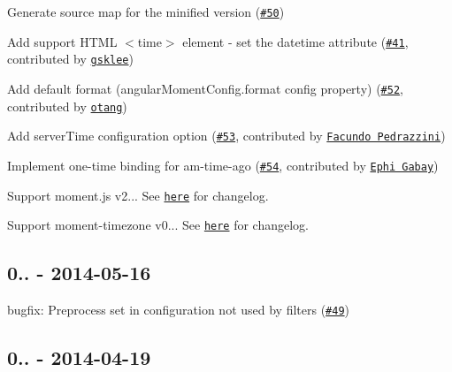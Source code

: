 \begin{DoxyItemize}
\item Generate source map for the minified version (\href{https://github.com/urish/angular-moment/issues/50}{\tt \#50})
\item Add support H\+T\+ML {\ttfamily $<$time$>$} element -\/ set the {\ttfamily datetime} attribute (\href{https://github.com/urish/angular-moment/pull/41}{\tt \#41}, contributed by \href{https://github.com/gsklee}{\tt gsklee})
\item Add default format (angular\+Moment\+Config.\+format config property) (\href{https://github.com/urish/angular-moment/pull/52}{\tt \#52}, contributed by \href{https://github.com/otang}{\tt otang})
\item Add {\ttfamily server\+Time} configuration option (\href{https://github.com/urish/angular-moment/pull/53}{\tt \#53}, contributed by \href{https://github.com/Facuu7}{\tt Facundo Pedrazzini})
\item Implement one-\/time binding for {\ttfamily am-\/time-\/ago} (\href{https://github.com/urish/angular-moment/pull/54}{\tt \#54}, contributed by \href{https://github.com/ephigabay}{\tt Ephi Gabay})
\item Support moment.\+js v2... See \href{https://gist.github.com/ichernev/b0a3d456d5a84c9901d7}{\tt here} for changelog.
\item Support moment-\/timezone v0... See \href{https://github.com/moment/moment-timezone/blob/develop/changelog.md#010-2014-06-23}{\tt here} for changelog.
\end{DoxyItemize}

\subsection*{0.. -\/ 2014-\/05-\/16}


\begin{DoxyItemize}
\item bugfix\+: Preprocess set in configuration not used by filters (\href{https://github.com/urish/angular-moment/issues/49}{\tt \#49})
\end{DoxyItemize}

\subsection*{0.. -\/ 2014-\/04-\/19}


